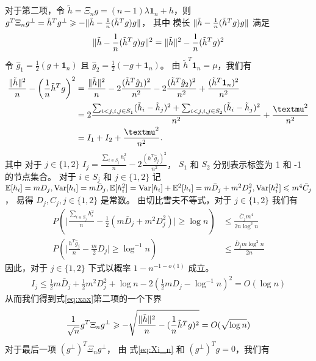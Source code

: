 对于第二项，令  $\tilde{h}=\Xi_n g
=(n-1)\lambda\mathbf{1}_n+h$，则
$g^T \Xi_n g^{\perp} = \tilde{h}^T g^{\perp} \geqslant -\lVert\tilde{h}-\frac{1}{n}(\tilde{h}^Tg)g\rVert$，
其中 模长 $\lVert\tilde{h}-\frac{1}{n}(\tilde{h}^Tg)g\rVert$ 满足
\begin{align*}
    \lVert\tilde{h}-\frac{1}{n}(\tilde{h}^Tg)g\rVert^2
    =\lVert\tilde{h}\rVert^2 - \frac{1}{n}(\tilde{h}^Tg)^2
\end{align*}
令 $\hat{g}_1 = \frac{1}{2}(g + \mathbf{1}_n)$ 且
$\hat{g}_2 = \frac{1}{2}(-g +\mathbf{1}_n)$。
由 $\tilde{h}^T\mathbf{1}_n=\mu$，我们有
\begin{align*}
    \frac{\norm{\tilde{h}}^2}{n} - \left(\frac{1}{n}\tilde{h}^Tg \right)^2
    &=\frac{\norm{\tilde{h}}^2}{n} - 2\frac{(\tilde{h}^T \hat{g}_1)^2}{n^2} - 2\frac{(\tilde{h}^T \hat{g}_2)^2}{n^2} + \frac{(\tilde{h}^T\mathbf{1}_n)^2}{n^2} \\
    &=2\frac{ \sum_{i<j,i,j\in S_1} (\tilde{h}_i - \tilde{h}_j)^2 + \sum_{i<j,i,j\in S_2} (\tilde{h}_i - \tilde{h}_j)^2 }{n^2}+ \frac{\mu^2}{n^2}\\
    & = I_1 + I_2 + \frac{\mu^2}{n^2}.
\end{align*}
其中 对于 $j\in\{1,2\}$
$I_j=\frac{\sum_{i\in S_j} h_i^2}{n} - 2\frac{(h^T \hat{g}_j)^2}{n^2}$， 
$S_1$ 和 $S_2$ 分别表示标签为 1 和 -1 的节点集合。
对于 $i\in S_j$ 和 $j\in\{1,2\}$
记 $\mathbb{E}[h_i]=m D_j, \operatorname{\mathrm{Var}}[h_i]=m \bar{D}_j, \mathbb{E}[h_i^2]=\operatorname{\mathrm{Var}}[h_i]+\mathbb{E}^2[h_i]=m \bar{D}_j+m^2 D^2_j, \operatorname{\mathrm{Var}}[h_i^2] \leqslant m^4 \bar{C}_j$，
易得
$D_j, C_j,j\in\{1,2\}$ 是常数。
由切比雪夫不等式，对于 $j\in\{1,2\}$
我们有
\begin{align*}
    P\left(\Big| \frac{\sum_{i\in S_j} h_i^2}{n} - \frac{1}{2}(m \bar{D}_j + m^2D_j^2) \Big| \geq \log n \right)
    & \leq \frac{\bar{C}_j m^4}{2n\log^2 n} \\
    P\left(\Big| \frac{h^T \hat{g}_j}{n} - \frac{m}{2}D_j\Big| \geq \log^{-1} n \right)
    & \leq \frac{\bar{D}_j m \log^{2} n}{2n}
\end{align*}
因此，对于 $j\in\{1,2\}$ 下式以概率 $1-n^{-1-o(1)}$ 成立。
\begin{align*}
    I_j \leq \frac{1}{2}m\bar{D}_j + \frac{1}{2}m^2 D_j^2 + \log n - 2(\frac{1}{2}m D_j - \log^{-1} n)^2 = O(\log n)
\end{align*}
从而我们得到式\eqref{eq:xax}第二项的一个下界
$$
\frac{1}{\sqrt{n}} g^T \Xi_n g^{\perp} \geqslant -\sqrt{\frac{\lVert\tilde{h}\rVert^2}{n} - (\frac{1}{n}\tilde{h}^Tg)^2} = O(\sqrt{\log n})
$$
对于最后一项 $(g^{\perp})^T \Xi_n g^{\perp}$，
由 式\eqref{eq:Xi_n} 和 $(g^{\perp})^Tg=0$，我们有
